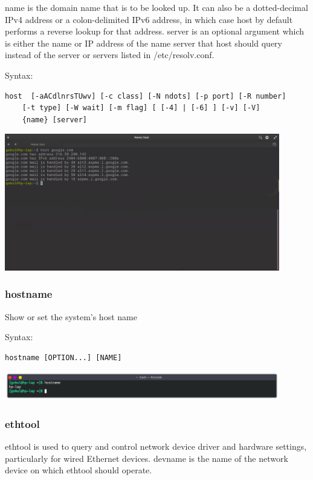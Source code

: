 name is the domain name that is to be looked up. It can also be a dotted-decimal IPv4 address or a colon-delimited IPv6
address, in which case host by default performs a reverse lookup for that address.  server is an optional argument  which
is  either  the  name  or IP address of the name server that host should query instead of the server or servers listed in
/etc/resolv.conf.
\linebreak[2]

Syntax:
\begin{lstlisting}
host  [-aACdlnrsTUwv] [-c class] [-N ndots] [-p port] [-R number] 
	[-t type] [-W wait] [-m flag] [ [-4] | [-6] ] [-v] [-V] 
	{name} [server]
\end{lstlisting}

\begin{center}
	\includegraphics[width=0.90\textwidth]{img/p1/ss9.png}
\end{center}


\subsubsection{hostname}
Show or set the system's host name
\linebreak[2]

Syntax:
\begin{lstlisting}
hostname [OPTION...] [NAME]
\end{lstlisting}

\begin{center}
	\includegraphics[width=0.90\textwidth]{img/p1/ss10.png}
\end{center}


\subsubsection{ethtool}
ethtool is used to query and control network device driver and hardware settings, particularly for wired Ethernet devices.
devname is the name of the network device on which ethtool should operate.
\linebreak[2]

